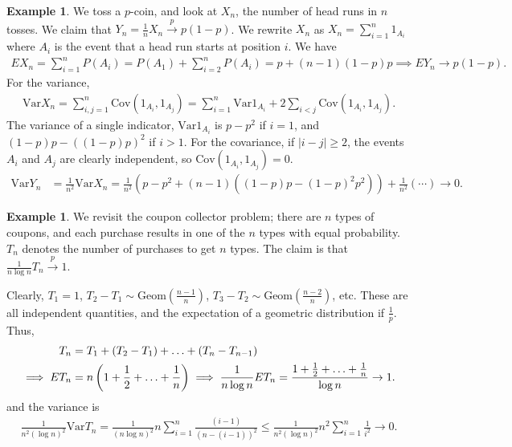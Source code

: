 \documentclass[15pt,a4paper]{book}
\theoremstyle{definition}
\newtheorem{example}[theorem]{Example}
\newcommand{\abs}[1]{\left| #1 \right|} %
\newcommand{\Var}{\text{Var}}
\newcommand{\Cov}{\text{Cov}}
\newcommand{\toup}[1]{\xrightarrow{#1}}
\begin{document}
\begin{example}
    We toss a $p$-coin, and look at $X_{n}$, the number of head runs in $n$ tosses. We claim that $Y_{n} = \frac{1}{n} X_{n} \toup{p} p(1-p)$. We rewrite $X_{n}$ as $X_{n} = \sum_{i=1}^{n} 1_{A_{i}}$ where $A_{i}$ is the event that a head run starts at position $i$. We have
    \begin{align}
        EX_{n} = \sum_{i=1}^{n} P(A_{i}) = P(A_{1}) + \sum_{i=2}^{n} P(A_{i}) = p + (n-1)(1-p)p \implies EY_{n} \to p(1-p).
    \end{align}
    For the variance,
    \begin{align}
        \Var X_{n} = \sum_{i,j=1}^{n} \text{Cov}(1_{A_{i}},1_{A_{j}}) = \sum_{i=1}^{n} \Var 1_{A_{i}} + 2 \sum_{i < j} \text{Cov}(1_{A_{i}},1_{A_{j}}).
    \end{align}
    The variance of a single indicator, $\Var 1_{A_{i}}$ is $p-p^{2}$ if $i = 1$, and $(1-p)p - ((1-p)p)^{2}$ if $i > 1$. For the covariance, if $\abs{i-j} \geq 2$, the events $A_{i}$ and $A_{j}$ are clearly independent, so $\Cov(1_{A_{i}},1_{A_{j}}) = 0$.
    \begin{align}
        \Var Y_{n} &= \frac{1}{n^{2}} \Var X_{n} = \frac{1}{n^{2}}(p-p^{2} + (n-1)((1-p)p - (1-p)^{2}p^{2})) + \frac{1}{n^{2}}(\cdots) \to 0.
    \end{align}
\end{example}

\begin{example}
    We revisit the coupon collector problem; there are $n$ types of coupons, and each purchase results in one of the $n$ types with equal probability. $T_{n}$ denotes the number of purchases to get $n$ types. The claim is that $\frac{1}{n \log n} T_{n} \toup{p} 1$.

    Clearly, $T_{1} = 1$, $T_{2} -T_{1} \sim \text{Geom}(\frac{n-1}{n})$, $T_{3}-T_{2} \sim \text{Geom}(\frac{n-2}{n})$, etc. These are all independent quantities, and the expectation of a geometric distribution if $\frac{1}{p}$. Thus,
    \begin{align}
        T_{n} &= T_{1} + (T_{2}-T_{1}) + \ldots + (T_{n}-T_{n-1}) \\
        \implies ET_{n} &= n \left( 1+\frac{1}{2} + \ldots + \frac{1}{n} \right) \notag \implies \frac{1}{n \log n} ET_{n} = \frac{1 + \frac{1}{2} + \ldots + \frac{1}{n}}{\log n} \to 1.
    \end{align}
    and the variance is
    \begin{align}
        \frac{1}{n^{2} (\log n)^{2}}\Var T_{n} = \frac{1}{(n\log n)^{2}} n \sum_{i=1}^{n} \frac{(i-1)}{(n-(i-1))^{2}} \leq \frac{1}{n^{2} (\log n)^{2}} n^{2} \sum_{i=1}^{n} \frac{1}{i^{2}} \to 0.
    \end{align}
\end{example}
\end{document}
